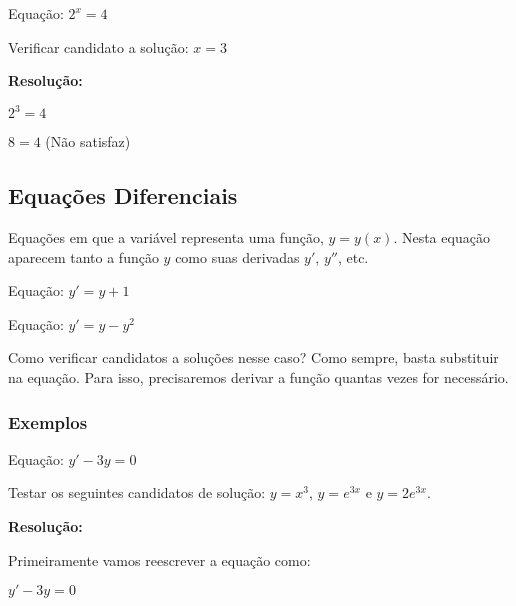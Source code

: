 \documentclass[a4paper]{article}
\providecommand{\sin}{} \renewcommand{\sin}{\hspace{2pt}\mathrm{sen}}
\begin{document}
Equação: $2^x = 4$

Verificar candidato a solução: $x=3$

{\bf Resolução:}

$2^3 = 4$

$8=4$ (Não satisfaz)




\subsection{Equações Diferenciais}

Equações em que a variável representa uma função, $y=y(x)$. Nesta
equação aparecem tanto a função $y$ como suas derivadas $y'$, $y''$,
etc.

Equação: $y' = y + 1$

Equação: $y' = y-y^2$

Como verificar candidatos a soluções nesse caso? Como sempre, basta
substituir na equação. Para isso, precisaremos derivar a função
quantas vezes for necessário.

\subsubsection{Exemplos}

Equação: $y' - 3y = 0$

Testar os seguintes candidatos de solução: $y=x^3$, $y=e^{3x}$ e $y=2e^{3x}$.



{\bf Resolução:}

Primeiramente vamos reescrever a equação como:

$y' - 3y = 0$
\end{document}
